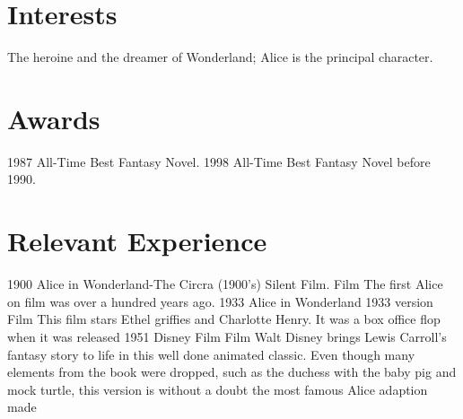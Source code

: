 \documentclass[a4]{resume} %
\begin{document}
\section{\bfseries{Interests}}

The heroine and the dreamer of Wonderland;  Alice is the principal character.
\newline


\section{\bfseries{Awards}}

\begin{sidebarshortlist} %
	  \sidebarshortlistitem
        {1987}
        {All-Time Best Fantasy Novel.}
	  \sidebarshortlistitem
        {1998}
        {All-Time Best Fantasy Novel before 1990.}
\end{sidebarshortlist}


\section{\bfseries{Relevant Experience}}

\begin{sidebarlonglist} %
    \sidebarlonglistitem
        {1900}
        {Alice in Wonderland-The Circra (1900's) Silent Film.}
        {Film}
        {The first Alice on film was over a hundred years ago.}
    \sidebarlonglistitem
        {1933}
        {Alice in Wonderland 1933 version}
        {Film}
        {This film stars Ethel griffies and Charlotte Henry. It was a box office flop when it was released}
    \sidebarlonglistitem
        {1951}
        {Disney Film}
        {Film}
        {Walt Disney brings Lewis Carroll's fantasy story to life in this well done animated classic. Even though many elements from the book were dropped, such as the duchess with the baby pig and mock turtle, this version is without a doubt the most famous Alice adaption made}
\end{sidebarlonglist}
\end{document}
